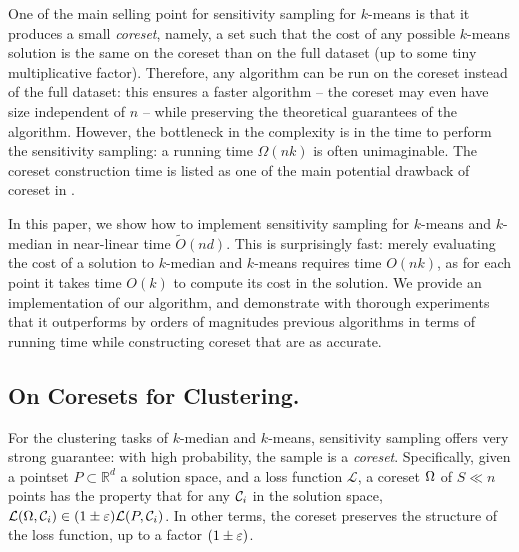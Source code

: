 One of the main selling point for sensitivity sampling for $k$-means is that it produces a small \textit{coreset}, namely, a set such that the cost of any possible $k$-means solution is the same on the coreset than on the full dataset (up to some tiny multiplicative factor).
Therefore, any algorithm can be run on the coreset instead of the full dataset: this ensures a faster algorithm  -- the coreset may even have size independent of $n$ -- while preserving the theoretical guarantees of the algorithm.
However, the bottleneck in the complexity is in the time to perform the sensitivity sampling: a running time $\Omega(nk)$ is often 	unimaginable. The coreset construction time is listed as one of the main potential drawback of coreset in \cite{Feldman20}.


In this paper, we show how to implement sensitivity sampling for $k$-means and $k$-median in near-linear time $\tilde O(nd)$.
This is surprisingly fast: merely evaluating the cost of a solution to $k$-median and $k$-means requires time $O(nk)$, as for each point it takes time $O(k)$ to compute its cost in the solution. 
We provide an implementation of our algorithm, and demonstrate with thorough experiments that it outperforms by orders of magnitudes previous algorithms in terms of running time while constructing coreset that are as accurate. 





\subsection{On Coresets for Clustering.}
For the clustering tasks of $k$-median and $k$-means, sensitivity sampling offers very strong guarantee: with high probability, the sample is a \textit{coreset}.
Specifically, given a pointset $P \subset \mathbb{R}^{d}$
a solution space, and a loss function $\mathcal{L}$, a coreset $\Omega$ of $S \ll n$ points has the property that for any $\mathcal C_i$ in the solution space, $\mathcal{L}(\Omega,
\mathcal C_i) \in (1 \pm \varepsilon) \mathcal{L}(P, \mathcal C_i)$. In other terms, the coreset preserves the structure of the loss function, up to a factor $(1\pm \varepsilon)$.

